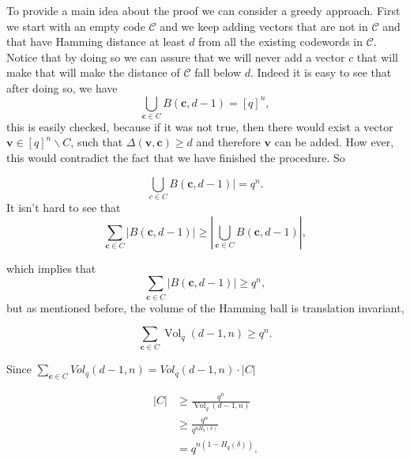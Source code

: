 To provide a main idea about the proof we can consider a greedy approach. First we start with an empty code $\mathcal{C}$ and we keep adding vectors that are not in $\mathcal{C}$ and that have Hamming distance at least $d$ from all the existing codewords in $\mathcal{C}$. Notice that by doing so we can assure that we will never add a vector $c$ that will make that will make the distance of $\mathcal{C}$ fall below $d$. Indeed it is easy to see that after doing so, we have
\begin{equation}
\bigcup_{\mathbf{c} \in C} B(\mathbf{c}, d-1)=[q]^{n},
\label{CH2:Gilbert_Varshamov_1}
\end{equation}
this is easily checked, because if it was not true, then there would exist a vector $\mathbf{v} \in[q]^{n} \backslash C$, such that $\Delta(\mathbf{v}, \mathbf{c}) \geq d$ and therefore $\mathbf{v}$ can be added. How ever, this would contradict the fact that we have finished the procedure. So

\begin{equation}
\bigcup_{c \in C} B(\mathbf{c}, d-1) \mid=q^{n}.
\label{CH2:Gilbert_Varshamov_2}
\end{equation}
It isn't hard to see that
\begin{equation}
\sum_{\mathbf{c} \in C}|B(\mathbf{c}, d-1)| \geq\left|\bigcup_{\mathbf{c} \in C} B(\mathbf{c}, d-1)\right|,
\label{CH2:Gilbert_Varshamov_3}
\end{equation}

which implies that
\begin{equation}
\sum_{\mathbf{c} \in C}|B(\mathbf{c}, d-1)| \geq q^{n},
\label{CH2:Gilbert_Varshamov_4}
\end{equation}
but as mentioned before, the volume of the Hamming ball is translation invariant,

\begin{equation}
\sum_{\mathbf{c} \in C} \operatorname{Vol}_{q}(d-1, n) \geq q^{n}.
\label{CH2:Gilbert_Varshamov_5}
\end{equation}

Since $\sum_{\mathbf{c} \in C} V o l_{q}(d-1, n)=V o l_{q}(d-1, n) \cdot|C|$ 

\begin{equation}
\begin{aligned}
|C| & \geq \frac{q^{n}}{\operatorname{Vol}_{q}(d-1, n)} \\
& \geq \frac{q^{n}}{q^{n H_{q}(\delta)}} \\
&=q^{n\left(1-H_{q}(\delta)\right)}.
\end{aligned}
\label{CH2:Gilbert_Varshamov_final}
\end{equation}

